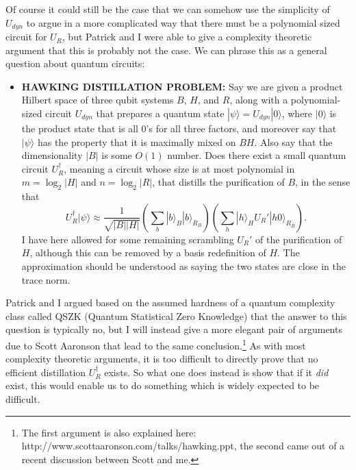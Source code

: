\documentclass[12pt]{article}
\newcommand{\be}{\begin{equation}}
\newcommand{\ee}{\end{equation}}
\newcommand{\ran}{\rangle}
\begin{document}
Of course it could still be the case that we can somehow use the simplicity of $U_{dyn}$ to argue in a more complicated way that there must be a polynomial sized circuit for $U_R$, but Patrick and I were able to give a complexity theoretic argument that this is probably not the case.  We can phrase this as a general question about quantum circuits:
\begin{itemize}
\item \textbf{HAWKING DISTILLATION PROBLEM:} Say we are given a product Hilbert space of three qubit systems $B$, $H$, and $R$, along with a polynomial-sized circuit $U_{dyn}$ that prepares a quantum state $|\psi\ran=U_{dyn}|0\ran$, where $|0\ran$ is the product state that is all $0$'s for all three factors, and moreover say that $|\psi\ran$ has the property that it is maximally mixed on $BH$.  Also say that the dimensionality $|B|$ is some $O(1)$ number.  Does there exist a small quantum circuit $U_R^\dagger$, meaning a circuit whose size is at most polynomial in $m=\log_2|H|$ and $n=\log_2|R|$, that distills the purification of $B$, in the sense that
\be
U_R^{\dagger}|\psi\ran\approx\frac{1}{\sqrt{|B||H|}} \left( \sum_b |b\ran_B |b\ran_{R_B}\right)\left(\sum_{h} |h\ran_H U_R'|h0\ran_{R_{\bar{B}}}\right).
\ee
I have here allowed for some remaining scrambling $U_R'$ of the purification of $H$, although this can be removed by a basis redefinition of $H$.  The approximation should be understood as saying the two states are close in the trace norm.  
\end{itemize}
Patrick and I argued based on the assumed hardness of a quantum complexity class called QSZK (Quantum Statistical Zero Knowledge) that the answer to this question is typically no, but I will instead give a more elegant pair of arguments due to Scott Aaronson that lead to the same conclusion.\footnote{The first argument is also explained here: http://www.scottaaronson.com/talks/hawking.ppt, the second came out of a recent discussion between Scott and me.}  As with most complexity theoretic arguments, it is too difficult to directly prove that no efficient distillation $U_R^\dagger$ exists.  So what one does instead is show that if it \textit{did} exist, this would enable us to do something which is widely expected to be difficult.
\end{document}
